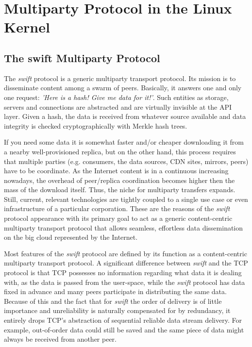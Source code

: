 
\chapter{Multiparty Protocol in the Linux Kernel}
\label{chapter:multiparty}


\section{The swift Multiparty Protocol}
\label{sec:multiparty:swift}

The \textit{swift} protocol is a generic multiparty transport protocol. Its
mission is to disseminate content among a swarm of peers. Basically, it
answers one and only one request: \textit{'Here is a hash! Give me data for
it!'}. Such entities as storage, servers and connections are abstracted and
are virtually invisible at the API layer. Given a hash, the data is received
from whatever source available and data integrity is checked cryptographically
with Merkle hash trees.


If you need some data it is somewhat faster and/or cheaper downloading it from
a nearby well-provisioned replica, but on the other hand, this process
requires that multiple parties (e.g. consumers, the data sources, CDN
sites, mirrors, peers) have to be coordinate. As the Internet
content is in a continuous increasing nowadays, the overhead of peer/replica
coordination becomes higher then the mass of the download itself. Thus, the
niche for multiparty transfers expands. Still, current, relevant technologies
are tightly coupled to a single use case or even infrastructure of a
particular corporation. These are the reasons of the \textit{swift} protocol
appearance with its primary goal to act as a generic content-centric
multiparty transport protocol that allows seamless, effortless data
dissemination on the big cloud represented by the Internet.

Most features of the \textit{swift} protocol are defined by its function as a
content-centric multiparty transport protocol. A significant difference
between \textit{swift} and the TCP protocol is that TCP possesses no
information regarding what data it is dealing with, as the data is passed from
the user-space, while the \textit{swift} protocol has data fixed in advance
and many peers participate in distributing the same data. Because of this and
the fact that for \textit{swift} the order of delivery is of little importance
and unreliability is naturally compensated for by redundancy, it entirely
drops TCP's abstraction of sequential reliable data stream delivery. For
example, out-of-order data could still be saved and the same piece of data
might always be received from another peer.

